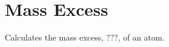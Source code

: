 \hypertarget{group___mass_excess}{}\section{Mass Excess}
\label{group___mass_excess}
Calculates the mass excess, $???$, of an atom. 